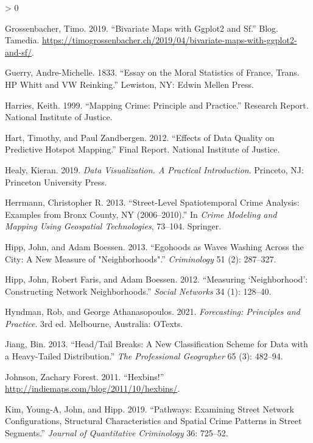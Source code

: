 \documentclass[
  krantz2]{krantz}
\newlength{\cslhangindent}
\newenvironment{CSLReferences}[2] %
 {%
  \setlength{\parindent}{0pt}
  \ifodd #1 \everypar{\setlength{\hangindent}{\cslhangindent}}\ignorespaces\fi
  \ifnum #2 > 0
  \setlength{\parskip}{#2\baselineskip}
  \fi
 }%
 {}
\begin{document}
\begin{CSLReferences}{1}{0}
\leavevmode\hypertarget{ref-Grossenbacher_2019}{}%
Grossenbacher, Timo. 2019. {``Bivariate Maps with Ggplot2 and Sf.''} Blog. Tamedia. \url{https://timogrossenbacher.ch/2019/04/bivariate-maps-with-ggplot2-and-sf/}.

\leavevmode\hypertarget{ref-Guerry_1833}{}%
Guerry, Andre-Michelle. 1833. {``Essay on the Moral Statistics of France, Trans. HP Whitt and VW Reinking.''} Lewiston, NY: Edwin Mellen Press.

\leavevmode\hypertarget{ref-Harries_1999}{}%
Harries, Keith. 1999. {``Mapping Crime: Principle and Practice.''} Research Report. National Institute of Justice.

\leavevmode\hypertarget{ref-Hart_2012}{}%
Hart, Timothy, and Paul Zandbergen. 2012. {``Effects of Data Quality on Predictive Hotspot Mapping.''} Final Report. National Institute of Justice.

\leavevmode\hypertarget{ref-Healy_2019}{}%
Healy, Kieran. 2019. \emph{Data Visualization. A Practical Introduction}. Princeto, NJ: Princeton University Press.

\leavevmode\hypertarget{ref-Herrmann_2013}{}%
Herrmann, Christopher R. 2013. {``Street-Level Spatiotemporal Crime Analysis: Examples from Bronx County, NY (2006--2010).''} In \emph{Crime Modeling and Mapping Using Geospatial Technologies}, 73--104. Springer.

\leavevmode\hypertarget{ref-Hipp_2013}{}%
Hipp, John, and Adam Boessen. 2013. {``Egohoods as Waves Washing Across the City: A New Measure of "Neighborhoods".''} \emph{Criminology} 51 (2): 287--327.

\leavevmode\hypertarget{ref-Hipp_2012}{}%
Hipp, John, Robert Faris, and Adam Boessen. 2012. {``Measuring {`Neighborhood'}: Constructing Network Neighborhoods.''} \emph{Social Networks} 34 (1): 128--40.

\leavevmode\hypertarget{ref-Hyndman_2021}{}%
Hyndman, Rob, and George Athanasopoulos. 2021. \emph{Forecasting: Principles and Practice}. 3rd ed. Melbourne, Australia: OTexts.

\leavevmode\hypertarget{ref-Jiang_2013}{}%
Jiang, Bin. 2013. {``Head/Tail Breaks: A New Classification Scheme for Data with a Heavy-Tailed Distribution.''} \emph{The Professional Geographer} 65 (3): 482--94.

\leavevmode\hypertarget{ref-Johnson_2011}{}%
Johnson, Zachary Forest. 2011. {``Hexbins!''} \url{http://indiemaps.com/blog/2011/10/hexbins/}.

\leavevmode\hypertarget{ref-Kim_2019}{}%
Kim, Young‑A, John, and Hipp. 2019. {``Pathways: Examining Street Network Configurations, Structural Characteristics and Spatial Crime Patterns in Street Segments.''} \emph{Journal of Quantitative Criminology} 36: 725--52.


\end{CSLReferences}
\end{document}
